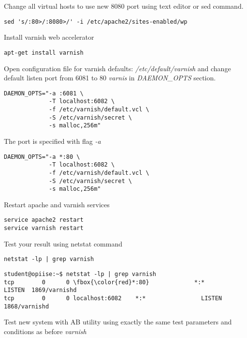 Change all virtual hosts to use new 8080 port using text editor or sed command.

\begin{verbatim}
sed 's/:80>/:8080>/' -i /etc/apache2/sites-enabled/wp
\end{verbatim}


Install varnish web accelerator 

\begin{verbatim}
apt-get install varnish
\end{verbatim}

Open configuration file for varnish defaults: \emph{/etc/default/varnish} and change default listen port from 6081 to 80 \emph{varnis}  in \emph{DAEMON\_OPTS} section.
\begin{verbatim}
DAEMON_OPTS="-a :6081 \
             -T localhost:6082 \
             -f /etc/varnish/default.vcl \
             -S /etc/varnish/secret \
             -s malloc,256m" 
\end{verbatim}
The port is specified with flag \emph{-a}
\begin{verbatim}
DAEMON_OPTS="-a *:80 \
             -T localhost:6082 \
             -f /etc/varnish/default.vcl \
             -S /etc/varnish/secret \
             -s malloc,256m" 
\end{verbatim}

Restart apache and varnish services
\begin{verbatim}
service apache2 restart
service varnish restart
\end{verbatim}
Test your result using netstat command

\begin{verbatim}
netstat -lp | grep varnish
\end{verbatim}


\begin{Verbatim}[frame=single,
label=Command output,framesep=2mm,rulecolor=\color{red},commandchars=\\\{\}]
student@opiise:~$ netstat -lp | grep varnish
tcp        0      0 \fbox{\color{red}*:80}             *:*                LISTEN  1869/varnishd   
tcp        0      0 localhost:6082    *:*                LISTEN  1868/varnishd   
\end{Verbatim}

Test new system with AB utility using exactly the same test parameters and conditions as before \emph{varnish}


